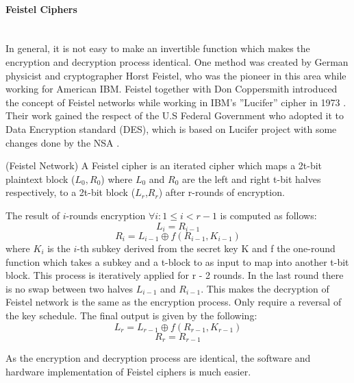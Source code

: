 \paragraph{Feistel Ciphers} \mbox{} \\
In general, it is not easy to make an invertible function which makes the encryption and decryption process identical. One method was created by German physicist and cryptographer Horst Feistel, who was the pioneer in this area while working for American IBM. Feistel together with Don Coppersmith introduced the concept of Feistel networks while working in IBM’s ”Lucifer” cipher in 1973 \cite{feistel1973cryptography}. Their work gained the respect of the U.S Federal Government who adopted it to Data Encryption standard (DES), which is based on Lucifer project with some changes done by the NSA \cite{pub197746}.
\begin{mydef}
	(Feistel Network) A Feistel cipher is an iterated cipher which maps a 2t-bit plaintext block ($L_{0},R_{0}$) where $L_{0}$ and $ R_{0}$ are the left and right t-bit halves respectively, to a 2t-bit block ($L_{r}$,$R_{r}$) after r-rounds of encryption.
\end{mydef}
The result of $i$-rounds encryption $\forall i : 1 \leq i < r - 1 $ is computed as follows:
$$ L_{i} = R_{i-1}$$
$$ R_{i} = L_{i-1} \oplus f(R_{i-1},K_{i-1})$$
where $K_{i}$ is the $i$-th subkey derived from the secret key K and f the one-round function which takes a subkey and a t-block to as input to map into another t-bit block. This process is iteratively applied for r - 2 rounds. In the last round there is no swap between two halves $L_{i-1}$ and $R_{i-1}$. This makes the decryption of Feistel network is the same as the encryption process. Only require a reversal of the key schedule. The final output is given by the following: $$ L_{r} = L_{r-1} \oplus f(R_{r-1},K_{r-1})$$
$$R_{r} = R_{r-1}$$

As the encryption and decryption process are identical, the software and hardware implementation of Feistel ciphers is much easier. 
